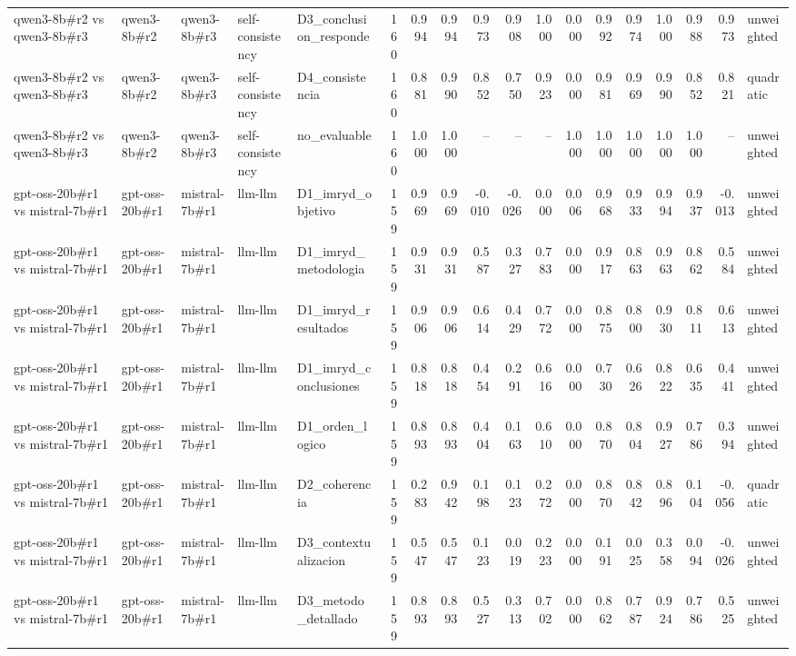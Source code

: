 \begin{table}
{\begin{tabular}{lllllrrrrrrrrrrrrl}
qwen3-8b\#r2 vs qwen3-8b\#r3 & qwen3-8b\#r2 & qwen3-8b\#r3 & self-consistency & D3\_conclusion\_responde & 160 & 0.994 & 0.994 & 0.973 & 0.908 & 1.000 & 0.000 & 0.992 & 0.974 & 1.000 & 0.988 & 0.973 & unweighted \\
qwen3-8b\#r2 vs qwen3-8b\#r3 & qwen3-8b\#r2 & qwen3-8b\#r3 & self-consistency & D4\_consistencia & 160 & 0.881 & 0.990 & 0.852 & 0.750 & 0.923 & 0.000 & 0.981 & 0.969 & 0.990 & 0.852 & 0.821 & quadratic \\
qwen3-8b\#r2 vs qwen3-8b\#r3 & qwen3-8b\#r2 & qwen3-8b\#r3 & self-consistency & no\_evaluable & 160 & 1.000 & 1.000 & -- & -- & -- & 1.000 & 1.000 & 1.000 & 1.000 & 1.000 & -- & unweighted \\
gpt-oss-20b\#r1 vs mistral-7b\#r1 & gpt-oss-20b\#r1 & mistral-7b\#r1 & llm-llm & D1\_imryd\_objetivo & 159 & 0.969 & 0.969 & -0.010 & -0.026 & 0.000 & 0.006 & 0.968 & 0.933 & 0.994 & 0.937 & -0.013 & unweighted \\
gpt-oss-20b\#r1 vs mistral-7b\#r1 & gpt-oss-20b\#r1 & mistral-7b\#r1 & llm-llm & D1\_imryd\_metodologia & 159 & 0.931 & 0.931 & 0.587 & 0.327 & 0.783 & 0.000 & 0.917 & 0.863 & 0.963 & 0.862 & 0.584 & unweighted \\
gpt-oss-20b\#r1 vs mistral-7b\#r1 & gpt-oss-20b\#r1 & mistral-7b\#r1 & llm-llm & D1\_imryd\_resultados & 159 & 0.906 & 0.906 & 0.614 & 0.429 & 0.772 & 0.000 & 0.875 & 0.800 & 0.930 & 0.811 & 0.613 & unweighted \\
gpt-oss-20b\#r1 vs mistral-7b\#r1 & gpt-oss-20b\#r1 & mistral-7b\#r1 & llm-llm & D1\_imryd\_conclusiones & 159 & 0.818 & 0.818 & 0.454 & 0.291 & 0.616 & 0.000 & 0.730 & 0.626 & 0.822 & 0.635 & 0.441 & unweighted \\
gpt-oss-20b\#r1 vs mistral-7b\#r1 & gpt-oss-20b\#r1 & mistral-7b\#r1 & llm-llm & D1\_orden\_logico & 159 & 0.893 & 0.893 & 0.404 & 0.163 & 0.610 & 0.000 & 0.870 & 0.804 & 0.927 & 0.786 & 0.394 & unweighted \\
gpt-oss-20b\#r1 vs mistral-7b\#r1 & gpt-oss-20b\#r1 & mistral-7b\#r1 & llm-llm & D2\_coherencia & 159 & 0.283 & 0.942 & 0.198 & 0.123 & 0.272 & 0.000 & 0.870 & 0.842 & 0.896 & 0.104 & -0.056 & quadratic \\
gpt-oss-20b\#r1 vs mistral-7b\#r1 & gpt-oss-20b\#r1 & mistral-7b\#r1 & llm-llm & D3\_contextualizacion & 159 & 0.547 & 0.547 & 0.123 & 0.019 & 0.223 & 0.000 & 0.191 & 0.025 & 0.358 & 0.094 & -0.026 & unweighted \\
gpt-oss-20b\#r1 vs mistral-7b\#r1 & gpt-oss-20b\#r1 & mistral-7b\#r1 & llm-llm & D3\_metodo\_detallado & 159 & 0.893 & 0.893 & 0.527 & 0.313 & 0.702 & 0.000 & 0.862 & 0.787 & 0.924 & 0.786 & 0.525 & unweighted \\

\end{tabular}}
\end{table}
